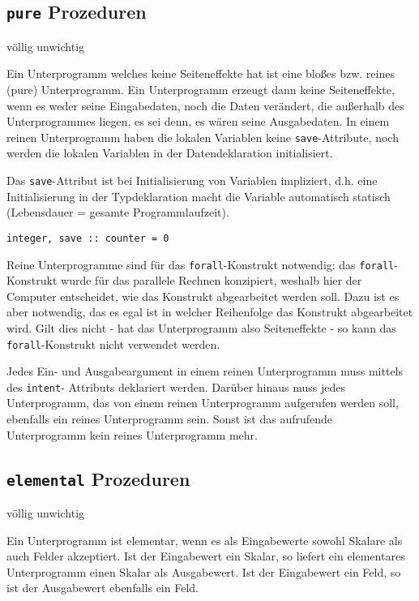 \subsection{\texttt{pure} Prozeduren}

\begin{*anmerkung}
	völlig unwichtig
\end{*anmerkung}

Ein Unterprogramm welches keine Seiteneffekte hat ist eine bloßes bzw. reines (pure) Unterprogramm. Ein Unterprogramm erzeugt dann keine Seiteneffekte, wenn es weder seine Eingabedaten, noch die Daten verändert, die außerhalb des Unterprogrammes liegen, es sei denn, es wären seine Ausgabedaten. In einem reinen Unterprogramm haben die lokalen Variablen keine \texttt{save}-Attribute, noch werden die lokalen Variablen in der Datendeklaration initialisiert.

Das \texttt{save}-Attribut ist bei Initialisierung von Variablen impliziert, d.h. eine Initialisierung in der Typdeklaration macht die Variable automatisch statisch (Lebensdauer = gesamte Programmlaufzeit).
\begin{lstlisting}
integer, save :: counter = 0
\end{lstlisting}

Reine Unterprogramme sind für das \texttt{forall}-Konstrukt notwendig: das \texttt{forall}-Konstrukt wurde für das parallele Rechnen konzipiert, weshalb hier der Computer entscheidet, wie das Konstrukt abgearbeitet werden soll. Dazu ist es aber notwendig, das es egal ist in welcher Reihenfolge das Konstrukt abgearbeitet wird. Gilt dies nicht - hat das Unterprogramm also Seiteneffekte - so kann das \texttt{forall}-Konstrukt nicht verwendet werden.

Jedes Ein- und Ausgabeargument in einem reinen Unterprogramm muss mittels des \texttt{intent}- Attributs deklariert werden. Darüber hinaus muss jedes Unterprogramm, das von einem reinen Unterprogramm aufgerufen werden soll, ebenfalls ein reines Unterprogramm sein. Sonst ist das aufrufende Unterprogramm kein reines Unterprogramm mehr.

\subsection{\texttt{elemental} Prozeduren}

\begin{*anmerkung}
	völlig unwichtig
\end{*anmerkung}

Ein Unterprogramm ist elementar, wenn es als Eingabewerte sowohl Skalare als auch Felder akzeptiert. Ist der Eingabewert ein Skalar, so liefert ein elementares Unterprogramm einen Skalar als Ausgabewert. Ist der Eingabewert ein Feld, so ist der Ausgabewert ebenfalls ein Feld.

